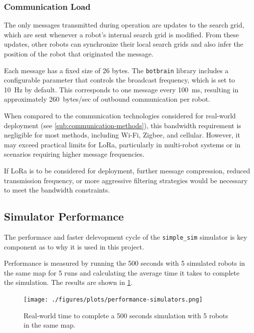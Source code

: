 \subsubsection{Communication {\color{red}Load}}
The only messages transmitted during operation are updates to the search grid, which are sent whenever a robot’s internal search grid is modified. From these updates, other robots can synchronize their local search grids and also infer the position of the robot that originated the message.

Each message has a fixed size of 26 bytes. The \texttt{botbrain} library includes a configurable parameter that controls the broadcast frequency, which is set to \SI{10}{Hz} by default. This corresponds to one message every \SI{100}{ms}, resulting in approximately \SI{260}{bytes/sec} of outbound communication per robot.

When compared to the communication technologies considered for real-world deployment (see \cref{sub:communication-methods}), this bandwidth requirement is negligible for most methods, including Wi-Fi, Zigbee, and cellular. However, it may exceed practical limits for LoRa, particularly in multi-robot systems or in scenarios requiring higher message frequencies.

If LoRa is to be considered for deployment, further message compression, reduced transmission frequency, or more aggressive filtering strategies would be necessary to meet the bandwidth constraints.


\subsection{Simulator Performance}
\label{sec:simulator-performance}
The performace and faster delevopment cycle of the \texttt{simple\_sim} simulator is key component as to why it is used in this project.

Performance is measured by running the 500 seconds with 5 simulated robots in the same map for 5 runs and calculating the average time it takes to complete the simulation. The results are shown in \cref{fig:simulator-performance}.

\begin{figure}[H]
    \begin{center}
        \texttt{[image: ./figures/plots/performance-simulators.png]}
    \end{center}
    \caption{Real-world time to complete a 500 seconds simulation with 5 robots in the same map.}
    \label{fig:simulator-performance}
\end{figure}
